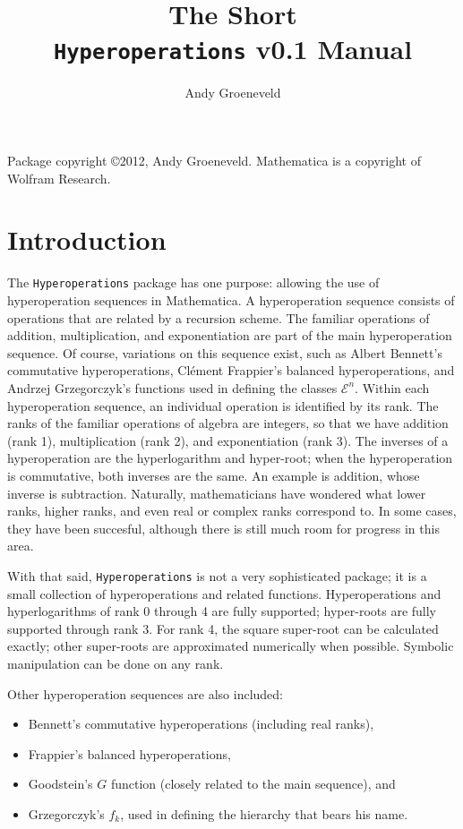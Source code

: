 \documentclass[letterpaper]{article}
\title{{\small The Short} \\ \texttt{Hyperoperations} v0.1 Manual}
\author{Andy Groeneveld}
\begin{document}
\maketitle

\noindent Package copyright \copyright 2012, Andy Groeneveld.  Mathematica is a copyright of Wolfram Research.

\section{Introduction}
The \texttt{Hyperoperations} package has one purpose: allowing the use of hyperoperation sequences in Mathematica.  A hyperoperation sequence consists of operations that are related by a recursion scheme.  The familiar operations of addition, multiplication, and exponentiation are part of the main hyperoperation sequence.  Of course, variations on this sequence exist, such as Albert Bennett's commutative hyperoperations, Cl\'ement Frappier's balanced hyperoperations, and Andrzej Grzegorczyk's functions used in defining the classes $\mathcal{E}^n$.  Within each hyperoperation sequence, an individual operation is identified by its rank.  The ranks of the familiar operations of algebra are integers, so that we have addition (rank 1), multiplication (rank 2), and exponentiation (rank 3).  The inverses of a hyperoperation are the hyperlogarithm and hyper-root; when the hyperoperation is commutative, both inverses are the same.  An example is addition, whose inverse is subtraction.  Naturally, mathematicians have wondered what lower ranks, higher ranks, and even real or complex ranks correspond to.  In some cases, they have been succesful, although there is still much room for progress in this area.

With that said, \texttt{Hyperoperations} is not a very sophisticated package; it is a small collection of hyperoperations and related functions.  Hyperoperations and hyperlogarithms of rank 0 through 4 are fully supported;  hyper-roots are fully supported through rank 3.  For rank 4, the square super-root can be calculated exactly; other super-roots are approximated numerically when possible.  Symbolic manipulation can be done on any rank.

Other hyperoperation sequences are also included:
\begin{itemize}
  \item Bennett's commutative hyperoperations (including real ranks),
  \item Frappier's balanced hyperoperations,
  \item Goodstein's $G$ function (closely related to the main sequence), and
  \item Grzegorczyk's $f_k$, used in defining the hierarchy that bears his name.
\end{itemize}
\end{document}
